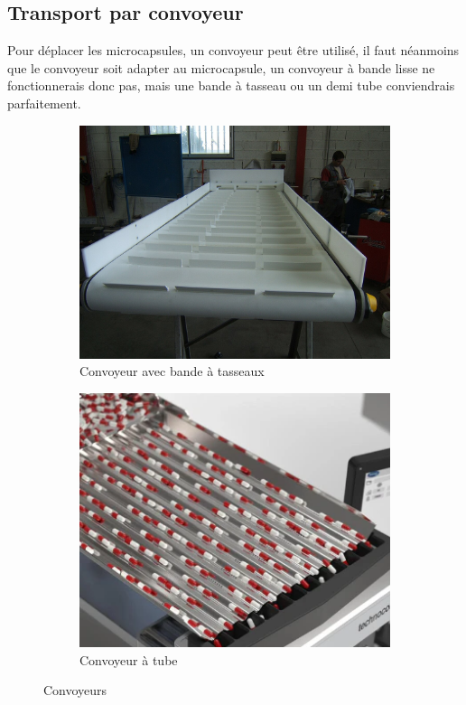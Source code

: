 \subsection*{Transport par convoyeur}
Pour déplacer les microcapsules, un convoyeur peut être utilisé, il faut néanmoins que le convoyeur soit adapter au microcapsule, un convoyeur à bande lisse ne fonctionnerais donc pas, mais une bande à tasseau ou un demi tube conviendrais parfaitement.
\begin{figure}[h!]
    \centering
    \begin{subfigure}{0.45\textwidth}
        \centering
        \includegraphics[width=\linewidth]{assets/figures/Hardware/transport_conv/convoyeur_tasseau.JPG}
        \caption{Convoyeur avec bande à tasseaux}
    \end{subfigure}\hfill
    \begin{subfigure}{0.45\textwidth}
        \centering
        \includegraphics[width=\linewidth]{assets/figures/Hardware/transport_conv/convoyeur_tube.png}
        \caption{Convoyeur à tube}
    \end{subfigure}
    \caption{Convoyeurs}
\end{figure}

